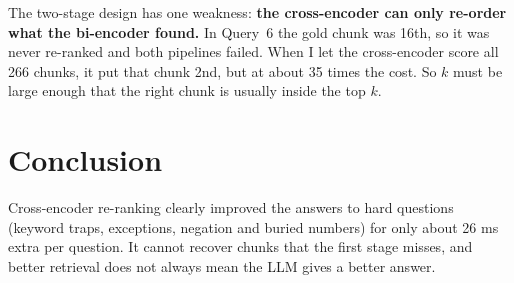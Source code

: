 \documentclass[11pt,a4paper]{article}
\begin{document}
The two-stage design has one weakness: \textbf{the cross-encoder can only re-order what the bi-encoder found.} In Query~6 the gold chunk was 16th, so it was never re-ranked and both pipelines failed. When I let the cross-encoder score all 266 chunks, it put that chunk 2nd, but at about 35 times the cost. So $k$ must be large enough that the right chunk is usually inside the top $k$.

\section*{Conclusion}

Cross-encoder re-ranking clearly improved the answers to hard questions (keyword traps, exceptions, negation and buried numbers) for only about 26 ms extra per question. It cannot recover chunks that the first stage misses, and better retrieval does not always mean the LLM gives a better answer.
\end{document}
